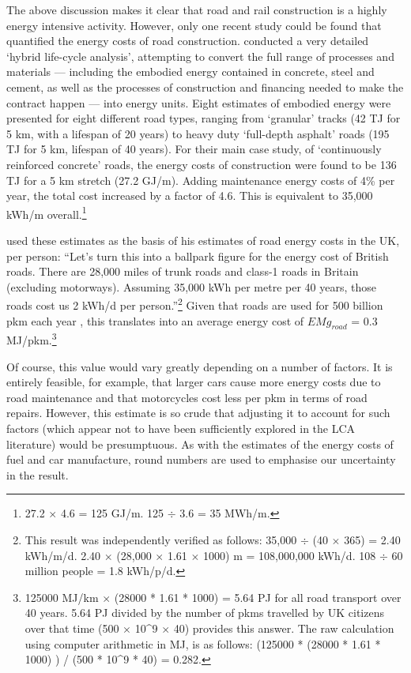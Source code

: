 The above discussion makes it clear that road and rail construction is a
highly energy intensive activity. However, only one recent study could be
found that quantified the energy costs of road construction.
\citet{Treloar2004} conducted a very detailed `hybrid life-cycle analysis',
attempting to convert the full range of processes and materials
--- including the embodied energy contained in concrete, steel and cement, as
well as the processes of construction and financing needed to make the
contract happen --- into energy units. Eight estimates of embodied energy
were presented for eight different road types, ranging from `granular'
tracks (42 TJ for 5 km, with a lifespan of 20 years) to heavy duty
`full-depth asphalt' roads (195 TJ for 5 km, lifespan of 40 years).
For their main case study, of `continuously reinforced concrete' roads,
the energy costs of construction were found to be 136 TJ for a 5 km stretch
(27.2 GJ/m). Adding maintenance energy costs of 4\%  per year, the total
cost increased by a factor of 4.6. This is equivalent to 35,000 kWh/m
overall.\footnote{27.2 
$\times$ 4.6 = 125 GJ/m. 125 $\div$ 3.6 = 35 MWh/m.
}

\citet[p.~90]{MacKay2009} used these estimates as the basis of his estimates
of road energy costs in the UK, per person: ``Let’s turn this into a ballpark figure
for the energy cost of British roads. There are 28,000 miles of trunk roads
and class-1 roads in Britain (excluding motorways). Assuming 35,000 kWh
per metre per 40 years, those roads cost us 2 kWh/d per
person.''\footnote{This 
result was independently verified as follows:
35,000 $\div$ (40 $\times$ 365) = 2.40 kWh/m/d.
2.40 $\times$ (28,000 $\times$ 1.61 $\times$ 1000) m = 108,000,000 kWh/d.
108 $\div$ 60 million people = 1.8 kWh/p/d.
}
Given that roads are used for 500 billion pkm each year \citep{Mills2011},
this translates into
an average energy cost of $EMg_{road}$ = 0.3
MJ/pkm.\footnote{125000 MJ/km $\times$ (28000 * 1.61 * 1000) = 5.64 PJ for all
road transport over 40 years. 5.64 PJ divided by the number of pkms
travelled by UK citizens over that time (500 $\times$ 10\textasciicircum9 $\times$ 40)
provides this answer. The raw calculation using computer arithmetic in MJ,
is as follows:
(125000 * (28000 * 1.61 * 1000) ) / (500 * 10\textasciicircum9 * 40) = 0.282.
}

Of course, this value would vary greatly depending on a number of factors.
It is entirely feasible, for example, that larger cars cause more energy costs
due to road maintenance and that motorcycles cost less per pkm in terms of
road repairs. However, this estimate is so crude that adjusting it to account
for such factors (which appear not to have been sufficiently explored in the
LCA literature) would be presumptuous. As with the estimates of the
energy costs of fuel and car manufacture, round numbers are used to emphasise
our uncertainty in the result.

